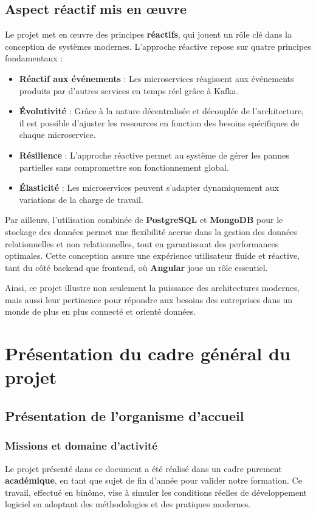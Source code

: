 \documentclass[12pt,a4paper]{report}
\begin{document}
\newpage
\section*{Aspect réactif mis en œuvre}
Le projet met en œuvre des principes \textbf{réactifs}, qui jouent un rôle clé dans la conception de systèmes modernes. L'approche réactive repose sur quatre principes fondamentaux :
\begin{itemize}
    \item \textbf{Réactif aux événements} : Les microservices réagissent aux événements produits par d'autres services en temps réel grâce à Kafka.
    \item \textbf{Évolutivité} : Grâce à la nature décentralisée et découplée de l'architecture, il est possible d'ajuster les ressources en fonction des besoins spécifiques de chaque microservice.
    \item \textbf{Résilience} : L'approche réactive permet au système de gérer les pannes partielles sans compromettre son fonctionnement global.
    \item \textbf{Élasticité} : Les microservices peuvent s'adapter dynamiquement aux variations de la charge de travail.
\end{itemize}

Par ailleurs, l'utilisation combinée de \textbf{PostgreSQL} et \textbf{MongoDB} pour le stockage des données permet une flexibilité accrue dans la gestion des données relationnelles et non relationnelles, tout en garantissant des performances optimales. Cette conception assure une expérience utilisateur fluide et réactive, tant du côté backend que frontend, où \textbf{Angular} joue un rôle essentiel.

Ainsi, ce projet illustre non seulement la puissance des architectures modernes, mais aussi leur pertinence pour répondre aux besoins des entreprises dans un monde de plus en plus connecté et orienté données.


\chapter{Pr\'esentation du cadre g\'en\'eral du projet}

\section{Pr\'esentation de l’organisme d’accueil}
\subsection*{Missions et domaine d’activit\'e}
Le projet pr\'esent\'e dans ce document a \'et\'e r\'ealis\'e dans un cadre purement \textbf{acad\'emique}, en tant que sujet de fin d'ann\'ee pour valider notre formation. Ce travail, effectu\'e en bin\^ome, vise \`a simuler les conditions r\'eelles de d\'eveloppement logiciel en adoptant des m\'ethodologies et des pratiques modernes.
\end{document}
